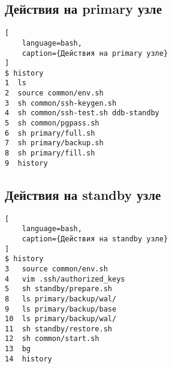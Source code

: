 \documentclass{article}
\begin{document}
\subsection{Действия на primary узле}

\begin{lstlisting}[
    language=bash,
    caption={Действия на primary узле}
]
$ history
1  ls
2  source common/env.sh 
3  sh common/ssh-keygen.sh 
4  sh common/ssh-test.sh ddb-standby
5  sh common/pgpass.sh 
6  sh primary/full.sh 
7  sh primary/backup.sh 
8  sh primary/fill.sh 
9  history
\end{lstlisting}

\subsection{Действия на standby узле}

\begin{lstlisting}[
    language=bash,
    caption={Действия на standby узле}
]
$ history
3   source common/env.sh
4   vim .ssh/authorized_keys 
5   sh standby/prepare.sh 
8   ls primary/backup/wal/
9   ls primary/backup/base
10  ls primary/backup/wal/
11  sh standby/restore.sh 
12  sh common/start.sh 
13  bg
14  history
\end{lstlisting}
\end{document}

